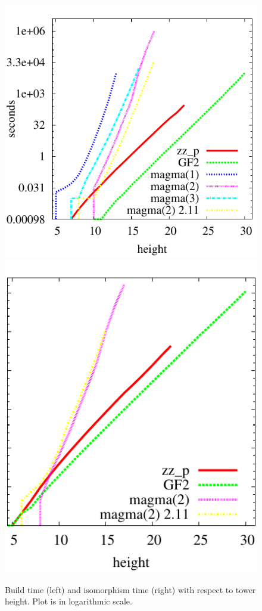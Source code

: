 \begin{figure}
  \centering
  \includegraphics[height=0.5\textwidth]{artin/build1}
  \includegraphics[height=0.5\textwidth]{artin/iso1}
  
  \caption{Build time (left) and isomorphism time (right) with respect to tower height. Plot is in logarithmic scale.}
  \label{fig:height}
\end{figure}

